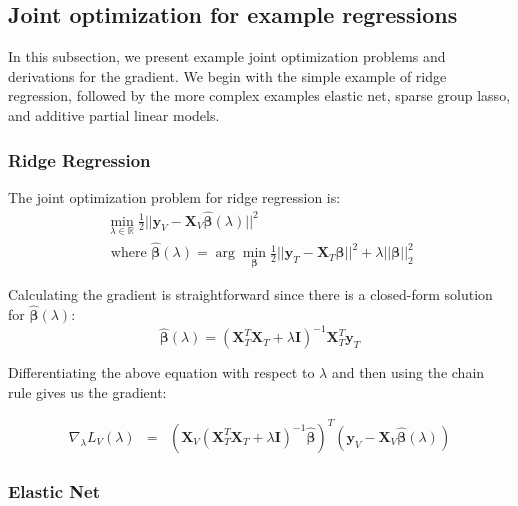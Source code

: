 \documentclass[10pt,letterpaper]{article}
\begin{document}
\subsection{Joint optimization for example regressions}

In this subsection, we present example joint optimization problems and derivations for the gradient. We begin with the simple example of ridge regression, followed by the more complex examples elastic net, sparse group lasso, and additive partial linear models.

\subsubsection{Ridge Regression}

The joint optimization problem for ridge regression is:
\begin{equation}
\begin{array}{c}
\min_{\lambda\in \mathbb{R}} \frac{1}{2} \lvert\lvert \boldsymbol{y}_V - \boldsymbol{X}_V \hat{\boldsymbol{\beta}} (\lambda) \rvert\rvert ^2 \\
\text{  where  } \hat{\boldsymbol{\beta}} (\lambda) = \arg \min_{\boldsymbol{\beta}} \frac{1}{2} \lvert\lvert \boldsymbol{y}_T - \boldsymbol{X}_T \boldsymbol{\beta} \rvert\rvert ^2 + \lambda \lvert\lvert \boldsymbol{\beta} \rvert\rvert_2^2
\end{array}
\end{equation}

Calculating the gradient is straightforward since there is a closed-form solution for $\hat{\boldsymbol{\beta}}(\lambda)$:
\begin{equation}
\hat{\boldsymbol{\beta}} (\lambda) = (\boldsymbol{X}_T^T\boldsymbol{X}_T + \lambda \boldsymbol{I})^{-1}\boldsymbol{X}_T^T\boldsymbol{y}_T
\end{equation}

Differentiating the above equation with respect to $\lambda$ and then using the chain rule gives us the gradient:

\begin{equation}
\begin{array} {lcl}
\nabla_\lambda L_V(\lambda)
&=& (\boldsymbol{X}_V(\boldsymbol{X}_T^T \boldsymbol{X}_T + \lambda \boldsymbol{I})^{-1}
\hat{\boldsymbol{\beta}})^T(\boldsymbol{y}_V - \boldsymbol{X}_V \hat{\boldsymbol{\beta}}(\lambda))
\end{array}
\end{equation}

\subsubsection{Elastic Net}
\end{document}
